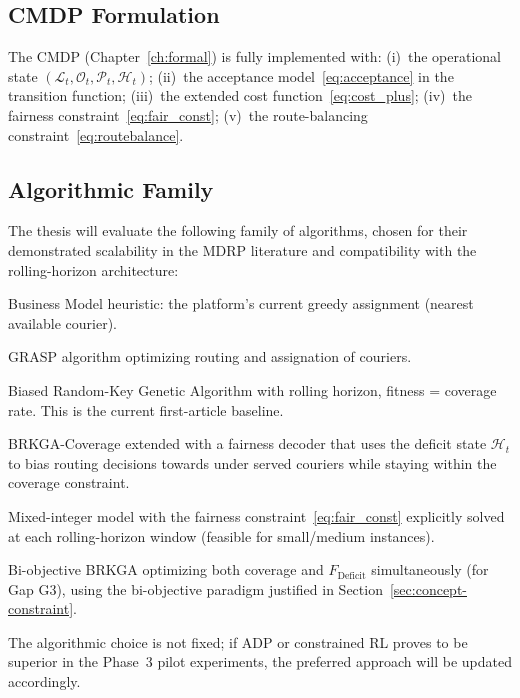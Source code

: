 \documentclass[12pt,a4paper]{report}
\begin{document}
\subsection{CMDP Formulation}
The CMDP (Chapter~\ref{ch:formal}) is fully implemented with: (i)~the operational state $(\mathcal{L}_t, \mathcal{O}_t, \mathcal{P}_t, \mathcal{H}_t)$; (ii)~the acceptance model~\eqref{eq:acceptance} in the transition function; (iii)~the extended cost function~\eqref{eq:cost_plus}; (iv)~the fairness constraint~\eqref{eq:fair_const}; (v)~the route-balancing constraint~\eqref{eq:routebalance}.

\subsection{Algorithmic Family}
The thesis will evaluate the following family of algorithms, chosen for their demonstrated scalability in the MDRP literature and compatibility with the rolling-horizon architecture:

\begin{description}[leftmargin=4.5cm,style=nextline]
    \item[Corporate baseline] Business Model heuristic: the platform's current greedy assignment (nearest available courier).
    \item[GRASP] GRASP algorithm optimizing routing and assignation of couriers.
    \item[BRKGA-Coverage] Biased Random-Key Genetic Algorithm with rolling horizon, fitness = coverage rate. This is the current first-article baseline.
    \item[BRKGA-Fair] BRKGA-Coverage extended with a fairness decoder that uses the deficit state $\mathcal{H}_t$ to bias routing decisions towards under served couriers while staying within the coverage constraint.
    \item[MIP-Fair] Mixed-integer model with the fairness constraint~\eqref{eq:fair_const} explicitly solved at each rolling-horizon window (feasible for small/medium instances).
    \item[Pay-BRKGA] Bi-objective BRKGA optimizing both coverage and $F_\text{Deficit}$ simultaneously (for Gap G3), using the bi-objective paradigm justified in Section~\ref{sec:concept-constraint}.
\end{description}

\noindent The algorithmic choice is not fixed; if ADP or constrained RL proves to be superior in the Phase~3 pilot experiments, the preferred approach will be updated accordingly.
\end{document}
